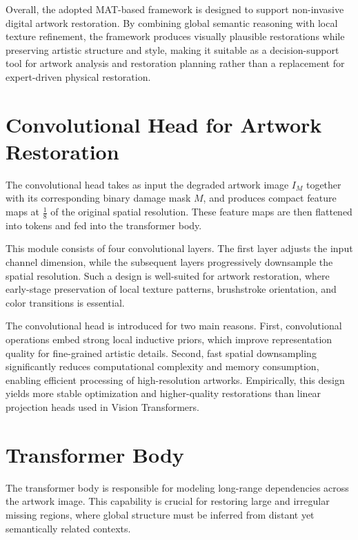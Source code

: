 \documentclass[12pt, twoside]{report}
\begin{document}
Overall, the adopted MAT-based framework is designed to support non-invasive digital artwork restoration. By combining global semantic reasoning with local texture refinement, the framework produces visually plausible restorations while preserving artistic structure and style, making it suitable as a decision-support tool for artwork analysis and restoration planning rather than a replacement for expert-driven physical restoration.

\section{Convolutional Head for Artwork Restoration}

The convolutional head takes as input the degraded artwork image $I_M$ together with its corresponding binary damage mask $M$, and produces compact feature maps at $\frac{1}{8}$ of the original spatial resolution. These feature maps are then flattened into tokens and fed into the transformer body.

This module consists of four convolutional layers. The first layer adjusts the input channel dimension, while the subsequent layers progressively downsample the spatial resolution. Such a design is well-suited for artwork restoration, where early-stage preservation of local texture patterns, brushstroke orientation, and color transitions is essential.

The convolutional head is introduced for two main reasons. First, convolutional operations embed strong local inductive priors, which improve representation quality for fine-grained artistic details. Second, fast spatial downsampling significantly reduces computational complexity and memory consumption, enabling efficient processing of high-resolution artworks. Empirically, this design yields more stable optimization and higher-quality restorations than linear projection heads used in Vision Transformers.

\section{Transformer Body}

The transformer body is responsible for modeling long-range dependencies across the artwork image. This capability is crucial for restoring large and irregular missing regions, where global structure must be inferred from distant yet semantically related contexts.
\end{document}
